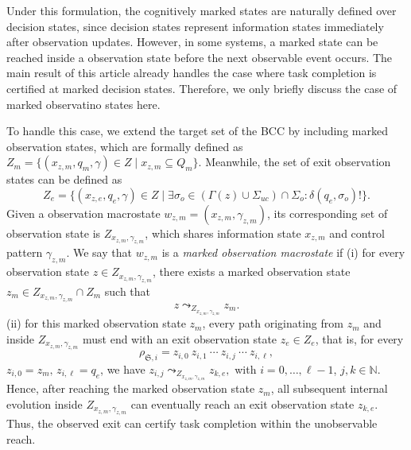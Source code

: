 \documentclass[final,5p,times,twocolumn,authoryear]{elsarticle}
\begin{document}
Under this formulation, the cognitively marked states are naturally defined over decision states, since decision states represent information states immediately after observation updates.
However, in some systems, a marked state can be reached inside a observation state before the next observable event occurs.
%
The main result of this article already handles the case where task completion is certified at marked decision states. Therefore, we only briefly discuss the case of marked observatino states here.

To handle this case, we extend the target set of the BCC by including marked observation states, which are formally defined as
$
    Z_{m} = \{ (x_{z,m}, q_m, \gamma) \in Z \mid x_{z,m} \subseteq Q_m \}.
$
Meanwhile, the set of exit observation states can be defined as
$$
    Z_{e}
    =
    \{ (x_{z,e}, q_e, \gamma) \in Z \mid
    \exists \sigma_o \in (\Gamma(z) \cup \Sigma_{uc}) \cap \Sigma_o : \delta(q_e,\sigma_o)! \}.
$$
%
Given a observation macrostate $w_{z,m} = (x_{z,m}, \gamma_{z,m})$, its corresponding set of observation state is $Z_{x_{z,m}, \gamma_{z,m}}$, which shares information state $x_{z,m}$ and control pattern $\gamma_{z,m}$. 
We say that $w_{z,m}$ is a \emph{marked observation macrostate} if (i) for every observation state $z \in Z_{x_{z,m}, \gamma_{z,m}}$, there exists a marked observation state $z_m \in Z_{x_{z,m}, \gamma_{z,m}} \cap Z_{m}$ such that
$$
    z \leadsto_{Z_{x_{z,m}, \gamma_{z,m}}} z_m.
$$
(ii) for this marked observation state $z_m$, every path originating from $z_m$ and inside $Z_{x_{z,m}, \gamma_{z,m}}$ must end with an exit observation state $z_e \in Z_{e}$, that is, for every
$$
    \rho_{\mathfrak{S}, i} = z_{i,0} \ z_{i,1} \ \cdots \ z_{i,j} \ \cdots \ z_{i,\ell},
$$
$z_{i,0} = z_m, \, z_{i,\ell} = q_e$, we have
$
    z_{i,j} \leadsto_{Z_{x_{z,m}, \gamma_{z,m}}} z_{k,e},
$
with $i = 0, \ldots , \ell - 1$, $j,k \in \mathbb{N}$.
Hence, after reaching the marked observation state $z_m$, all subsequent internal evolution inside $Z_{x_{z,m}, \gamma_{z,m}}$ can eventually reach an exit observation state $z_{k,e}$.
%
Thus, the observed exit can certify task completion within the unobservable reach.
\end{document}
